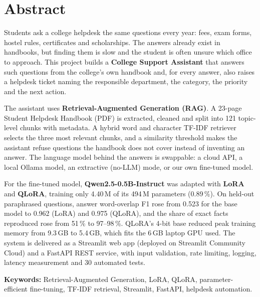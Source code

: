 \documentclass[11pt,a4paper]{report}
\begin{document}


\renewcommand{\contentsname}{Index}
\tableofcontents
\clearpage
{}

\chapter*{Abstract}

Students ask a college helpdesk the same questions every year: fees, exam forms, hostel rules,
certificates and scholarships. The answers already exist in handbooks, but finding them is slow
and the student is often unsure which office to approach. This project builds a
\textbf{College Support Assistant} that answers such questions from the college's own handbook
and, for every answer, also raises a helpdesk ticket naming the responsible department, the
category, the priority and the next action.

The assistant uses \textbf{Retrieval-Augmented Generation (RAG)}. A 23-page Student Helpdesk
Handbook (PDF) is extracted, cleaned and split into 121 topic-level chunks with metadata. A hybrid
word and character TF-IDF retriever selects the three most relevant chunks, and a similarity
threshold makes the assistant refuse questions the handbook does not cover instead of inventing
an answer. The language model behind the answers is swappable: a cloud API, a local Ollama model,
an extractive (no-LLM) mode, or our own fine-tuned model.

For the fine-tuned model, \textbf{Qwen2.5-0.5B-Instruct} was adapted with \textbf{LoRA} and
\textbf{QLoRA}, training only 4.40\,M of its 494\,M parameters (0.89\,\%). On held-out
paraphrased questions, answer word-overlap F1 rose from 0.523 for the base model to 0.962 (LoRA)
and 0.975 (QLoRA), and the share of exact facts reproduced rose from 51\,\% to 97--98\,\%.
QLoRA's 4-bit base reduced peak training memory from 9.3\,GB to 5.4\,GB, which fits the 6\,GB
laptop GPU used. The system is delivered as a Streamlit web app (deployed on Streamlit Community
Cloud) and a FastAPI REST service, with input validation, rate limiting, logging, latency
measurement and 30 automated tests.

\medskip
\noindent\textbf{Keywords:} Retrieval-Augmented Generation, LoRA, QLoRA, parameter-efficient
fine-tuning, TF-IDF retrieval, Streamlit, FastAPI, helpdesk automation.
\end{document}
